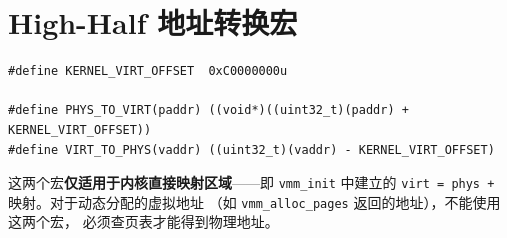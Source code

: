 \section{High-Half 地址转换宏}

\begin{lstlisting}[style=cstyle]
#define KERNEL_VIRT_OFFSET  0xC0000000u

#define PHYS_TO_VIRT(paddr) ((void*)((uint32_t)(paddr) + KERNEL_VIRT_OFFSET))
#define VIRT_TO_PHYS(vaddr) ((uint32_t)(vaddr) - KERNEL_VIRT_OFFSET)
\end{lstlisting}

\begin{warnbox}
这两个宏\textbf{仅适用于内核直接映射区域}——即 \texttt{vmm\_init} 中建立的
\texttt{virt = phys + } 映射。对于动态分配的虚拟地址
（如 \texttt{vmm\_alloc\_pages} 返回的地址），不能使用这两个宏，
必须查页表才能得到物理地址。
\end{warnbox}


